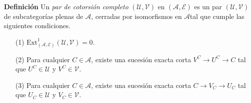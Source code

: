 \documentclass[preview]{standalone}
\begin{document}
\begin{center}
\justifying \textbf{Definición} Un \emph{par de cotorsión completo} $(\mathcal{U}, \mathcal{V})$ en $(\mathscr{A}, \mathscr{E})$ es un par $(\mathcal{U}, \mathcal{V})$ de subcategorías plenas de $\mathscr{A}$, cerradas por isomorfismos en $\mathscr{A}$tal que cumple las siguientes condiciones.\begin{itemize} \item[(1)] $\text{Ext}^1_{(\mathscr{A}, \mathscr{E})}(\mathcal{U}, \mathcal{V}) = 0$. \item[(2)] Para cualquier $C\in\mathscr{A}$, existe una sucesión exacta corta $V^C\to U^C\to C$ tal que $U^C\in\mathcal{U}$ y $V^C\in\mathcal{V}$. \item[(3)] Para cualquier $C\in\mathscr{A}$, existe una sucesión exacta corta $C\to V_C\to U_C$ tal que $U_C\in\mathcal{U}$ y $V_C\in\mathcal{V}$. \end{itemize}
\end{center}
\end{document}
